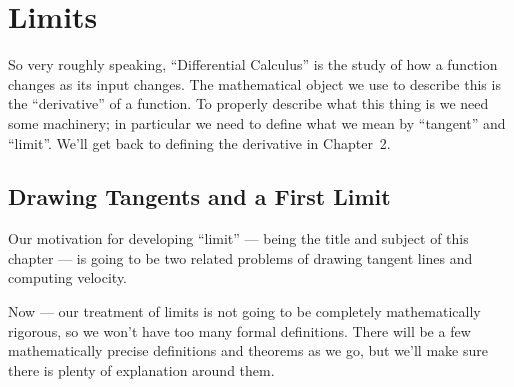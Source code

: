%
%
\graphicspath{{./figures/limits/}}


\chapter{Limits}\label{chap limits}

So very roughly speaking, ``Differential Calculus'' is the study of how a
function changes as its input changes. The mathematical object we use to
describe this is the ``derivative'' of a function. To properly describe what
this thing is we need some machinery; in particular we need to define what we
mean by ``tangent'' and ``limit''. We'll get back to defining the derivative in
Chapter~2.

\section{Drawing Tangents and a First Limit}\label{sec first lim}
Our motivation for developing ``limit'' --- being the title and subject of this
chapter --- is going to be two related problems of drawing tangent lines and
computing velocity.

Now --- our treatment of limits is not going to be completely mathematically
rigorous, so we won't have too many formal definitions. There will be a few
mathematically precise definitions and theorems as we go, but we'll make sure
there is plenty of explanation around them.

